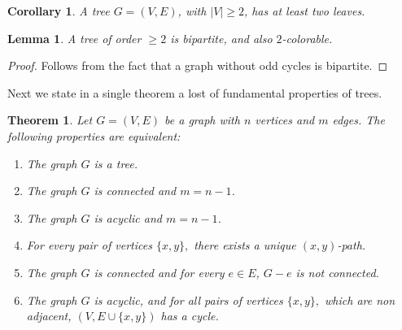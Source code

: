 \documentclass[12pt,a4paper]{article}
\newtheorem{lem}{Lemma}[section]
\newtheorem{thm}{Theorem}[section]
\newtheorem{cor}{Corollary}[section]
\theoremstyle{definition}
\begin{document}
\begin{cor} A tree $G=(V,E)$, with $|V| \geq 2$, has at least two leaves.
\end{cor}
\begin{lem} A tree of order $\geq 2$ is bipartite, and also $2$-colorable. 
\end{lem}
\begin{proof}
Follows from the fact that a graph without odd cycles is bipartite. 
\end{proof}
\newpage
Next we state in a single theorem a lost of fundamental properties of trees.
\begin{thm} \label{chartreethm} Let $G=(V,E)$ be a graph with $n$ vertices and $m$ edges. The following properties are equivalent:
\begin{enumerate}
\item The graph $G$ is a tree.
\item The graph $G$ is connected and $m=n-1$.
\item The graph $G$ is acyclic and $m=n-1$.
\item For every pair of vertices $\{x,y\},$ there exists a unique $(x,y)$-path.
\item The graph $G$ is connected and for every $e \in E$, $G-e$ is not connected.
\item The graph $G$ is acyclic, and for all pairs of vertices $\{x,y\},$ which are non adjacent, $(V,E \cup \{x,y\})$ has a cycle. 
\end{enumerate}
\end{thm}
\end{document}
